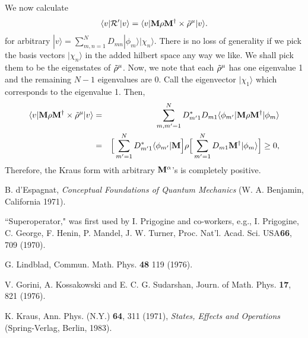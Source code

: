 \documentclass[aps,pra,amssymb, amsfonts,amsmath,showpacs, superscriptaddress,12pt]{revtex4}
\begin{document}
\begin{appendix}
We now calculate
\begin{equation}\label{B2}
\langle v|{\cal R}'|v\rangle=\langle v|{\bf M}{\bf\rho}{\bf M}^{\dagger}\times\tilde{\bf\rho}^{\mu}|v\rangle.
\end{equation}
\noindent for arbitrary $|v\rangle=\sum_{m,n=1}^{N}D_{mn}|\phi_{m}\rangle|\chi_{n}\rangle$.  There is no loss of generality if we pick the basis vectors  $|\chi_{n}\rangle$ in the added hilbert space any way we like.  We shall pick them  to be the eigenstates of  
$\tilde{\bf\rho}^{\mu}$. Now, we note that each $\tilde{\bf\rho}^{\mu}$ has one eigenvalue 1 and the remaining $N-1$ eigenvalues are 0.  
 Call the eigenvector  $|\chi_{1}\rangle$ which corresponds to the eigenvalue 1.  Then, 
\begin{eqnarray}\label{B3}
\langle v|{\bf M}{\bf \rho}{\bf M}^{\dagger}\times\tilde{\bf\rho}^{\mu}|v\rangle&=&\sum_{m,m' =1}^{N}
D_{m'1}^{*}D_{m1}\langle \phi_{m'}|{\bf M}{\bf \rho}{\bf M}^{\dagger}|\phi_{m}\rangle\nonumber\\
&=&\Big[\sum_{m' =1}^{N}D_{m'1}^{*}\langle \phi_{m'}|{\bf M}\Big]{\bf\rho}
\Big[\sum_{m' =1}^{N}D_{m1}{\bf M}^{\dagger}| \phi_{m}\rangle\Big]\geq 0,
\end{eqnarray}
\noindent Therefore,  the Kraus form with arbitrary ${\bf M}^{\alpha}$'s is completely positive.


\end{appendix}




\begin{thebibliography}{99}

 B. d'Espagnat, \textit{Conceptual Foundations of Quantum Mechanics} (W. A. Benjamin, California 1971).

 ``Superoperator," was first used by I. Prigogine and co-workers, e.g., I. Prigogine, C. George, F. Henin, P. Mandel, J. W. Turner, Proc. Nat'l. Acad. Sci. USA{\bf 66}, 709 (1970).  

 G. Lindblad, Commun. Math. Phys. {\bf 48} 119 (1976).

 V. Gorini, A. Kossakowski and E. C. G. Sudarshan, Journ. of Math. Phys. {\bf 17}, 821 (1976). 

 K. Kraus, Ann. Phys. (N.Y.) {\bf 64}, 311 (1971), \textit{ States, Effects and Operations} (Spring-Verlag, Berlin, 1983). 


\end{thebibliography}

 
\end{document}
